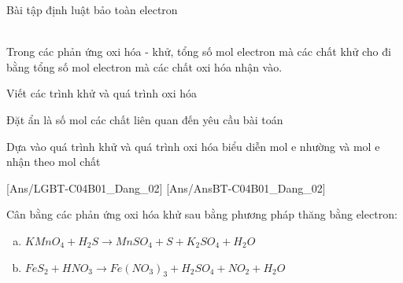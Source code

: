 \begin{dang}{Bài tập định luật bảo toàn electron}\end{dang}
\begin{pp}
	\\
	 Trong các phản ứng oxi hóa - khử, tổng số mol electron mà các chất khử cho đi bằng tổng số mol electron mà các chất oxi hóa nhận vào.
	\begin{cacbuoc}
		\item Viết các trình khử và quá trình oxi hóa
		\item Đặt ẩn là số mol các chất  liên quan đến yêu cầu bài toán
		\item Dựa vào quá trình khử và quá trình oxi hóa biểu diễn mol e nhường và mol e nhận theo mol chất
	\end{cacbuoc}
	\begin{center}
	\end{center}
\end{pp}
[Ans/LGBT-C04B01_Dang_02]
[Ans/AnsBT-C04B01_Dang_02]
	\begin{bt}
		Cân bằng các phản ứng oxi hóa khử sau bằng phương pháp thăng bằng electron:
		\begin{enumerate}[a)]
			\item $KMnO_4 + H_2S \rightarrow MnSO_4 + S + K_2SO_4 + H_2O$
			\item $FeS_2 + HNO_3 \rightarrow Fe(NO_3)_3 + H_2SO_4 + NO_2 + H_2O$
		\end{enumerate}
	\end{bt}
	
